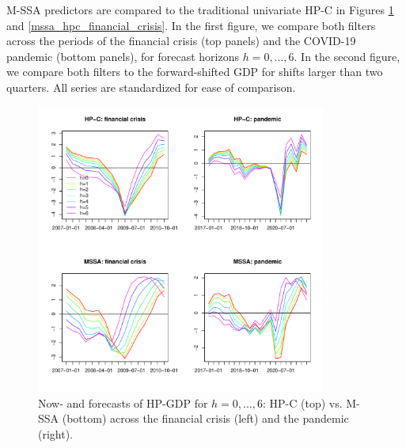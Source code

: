 \documentclass[11pt,a4paper]{article}
\begin{document}
M-SSA predictors are compared to the traditional univariate HP-C in Figures  \ref{multivar_vs_univar} and \ref{mssa_hpc_financial_crisis}. In the first figure, we compare both filters across the periods of the financial crisis (top panels) and the COVID-19 pandemic (bottom panels), for forecast horizons $h=0,...,6$. In the second figure, we compare both filters to the forward-shifted GDP for shifts larger than two quarters. All series are standardized for ease of comparison. 

\begin{figure}[H]
    \begin{center}
        \includegraphics[width=0.85\textwidth]{./Figures/multivar_vs_univar.pdf}
        \caption{Now- and forecasts of HP-GDP for $h=0,...,6$: HP-C (top) vs. M-SSA (bottom) across the financial crisis (left) and the pandemic (right).
        \label{multivar_vs_univar}}
    \end{center}
\end{figure}
\end{document}
